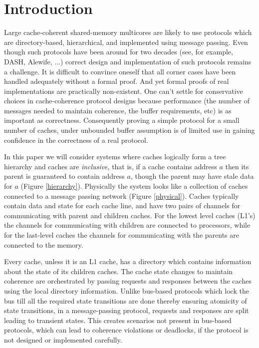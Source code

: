\section{Introduction} 

Large cache-coherent shared-memory multicores are likely to use protocols which
are directory-based, hierarchical, and implemented using message passing.  Even
though such protocols have been around for two decades (see, for example,
DASH\cite{DASH}, Alewife\cite{Anant}, ...) correct design and implementation of
such protocols remains a challenge. It is difficult to convince oneself that
all corner cases have been handled adequately without a formal proof. And yet
formal proofs of real implementations are practically non-existent. One can't
settle for conservative choices in cache-coherence protocol designs because
performance (\eg the number of messages needed to maintain coherence, the
buffer requirements, etc) is as important as correctness. Consequently proving
a simple protocol for a small number of caches, under unbounded buffer
assumption is of limited use in gaining confidence in the correctness of a real
protocol. 

In this paper we will consider systems where caches logically form a tree
hierarchy and caches are \emph{inclusive}, that is, if a cache contains address
$a$ then its parent is guaranteed to contain address $a$, though the parent may
have stale data for $a$ (Figure \ref{hierarchy}). Physically the system looks
like a collection of caches connected to a message passing network (Figure
\ref{physical}). Caches typically contain data and state for each cache line,
and have two pairs of channels for communicating with parent and children
caches. For the lowest level caches (L1's) the channels for communicating with
children are connected to processors, while for the last-level caches the
channels for communicating with the parents are connected to the memory. 

Every cache, unless it is an L1 cache, has a directory which contains
information about the state of its children caches. The cache state changes to
maintain coherence are orchestrated by passing requests and responses between
the caches using the local directory information.  Unlike bus-based protocols
which lock the bus till all the required state transitions are done thereby
ensuring atomicity of state transitions, in a message-passing protocol,
requests and responses are split leading to transient states. This creates
scenarios not present in bus-based protocols, which can lead to coherence
violations or deadlocks, if the protocol is not designed or implemented
carefully.

